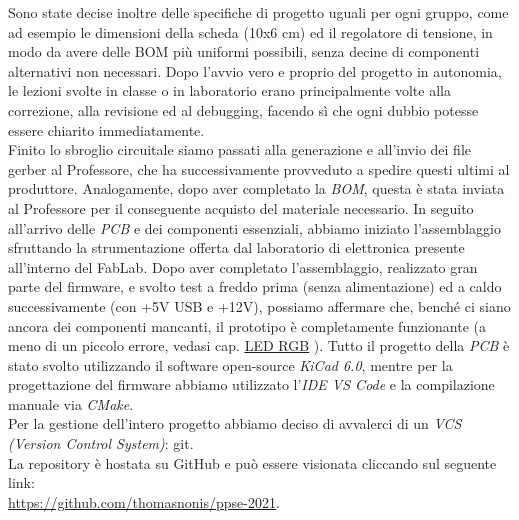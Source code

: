 Sono state decise inoltre delle specifiche di progetto uguali per ogni
gruppo, come ad esempio le dimensioni della scheda (10x6 cm) ed il
regolatore di tensione, in modo da avere delle BOM più uniformi
possibili, senza decine di componenti alternativi non necessari. Dopo
l'avvio vero e proprio del progetto in autonomia, le lezioni svolte in
classe o in laboratorio erano principalmente volte alla correzione, alla
revisione ed al debugging, facendo sì che ogni dubbio potesse essere
chiarito immediatamente.\\
Finito lo sbroglio circuitale siamo passati alla generazione e all'invio
dei file gerber al Professore, che ha successivamente provveduto a
spedire questi ultimi al produttore. Analogamente, dopo aver completato
la \emph{BOM}, questa è stata inviata al Professore per il conseguente
acquisto del materiale necessario. In seguito all'arrivo delle
\emph{PCB} e dei componenti essenziali, abbiamo iniziato l'assemblaggio
sfruttando la strumentazione offerta dal laboratorio di elettronica
presente all'interno del FabLab. Dopo aver completato l'assemblaggio,
realizzato gran parte del firmware, e svolto test a freddo prima (senza
alimentazione) ed a caldo successivamente (con +5V USB e +12V), possiamo
affermare che, benché ci siano ancora dei componenti mancanti, il
prototipo è completamente funzionante (a meno di un piccolo errore, vedasi
cap. \protect\hyperlink{led-rgb}{\underline{LED RGB}} ).
Tutto il progetto della \emph{PCB} è stato svolto utilizzando il
software open-source \emph{KiCad 6.0}, mentre per la progettazione del firmware
abbiamo utilizzato l'\emph{IDE VS Code} e la compilazione manuale via
\emph{CMake}.\\
Per la gestione dell'intero progetto abbiamo deciso di avvalerci di un
\emph{VCS (Version Control System)}: git.\\
La repository è hostata su GitHub e può essere visionata cliccando sul
seguente link:\\
\href{https://github.com/thomasnonis/ppse-2021}{\underline{https://github.com/thomasnonis/ppse-2021}}.
